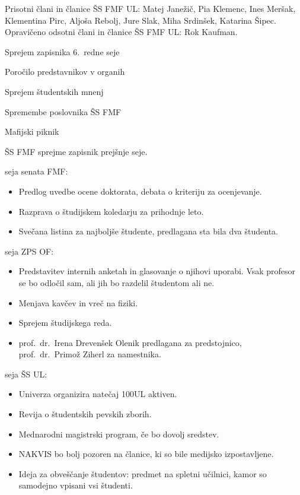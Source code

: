 \documentclass{seja}
\begin{document}
Prisotni člani in članice ŠS FMF UL:
Matej Janežič,
Pia Klemenc,
Ines Meršak,
Klementina Pirc,
Aljoša Rebolj,
Jure Slak,
Miha Srdinšek,
Katarina Šipec.
\\Opravičeno odsotni člani in članice ŠS FMF UL:
Rok Kaufman.

\begin{red*}
	\item
	Sprejem zapisnika 6.~redne seje
	\item
	Poročilo predstavnikov v organih
    \item
    Sprejem študentskih mnenj
    \item
    Spremembe poslovnika ŠS FMF
    \item
    Mafijski piknik
\end{red*}

\begin{ad}
    \item
    \begin{sklep*}
        ŠS FMF sprejme zapisnik prejšnje seje.
    \end{sklep*}

    \item
    seja senata FMF:
    \begin{itemize}
        \item Predlog uvedbe ocene doktorata, debata o kriteriju za ocenjevanje.
        \item Razprava o študijskem koledarju za prihodnje leto.
        \item Svečana listina za najboljše študente, predlagana sta bila dva študenta.
    \end{itemize}

    seja ZPS OF:
    \begin{itemize}
        \item Predstavitev internih anketah in glasovanje o njihovi uporabi. Vsak profesor se bo odločil sam, ali jih bo razdelil študentom ali ne.
        \item Menjava kavčev in vreč na fiziki.
        \item Sprejem študijskega reda.
        \item prof.~dr.~Irena Drevenšek Olenik predlagana za predstojnico, prof.~dr.~Primož Ziherl za namestnika.
    \end{itemize}

    seja ŠS UL:
    \begin{itemize}
        \item Univerza organizira natečaj 100UL aktiven.
        \item Revija o študentskih pevskih zborih.
        \item Mednarodni magistrski program, če bo dovolj sredstev.
        \item NAKVIS bo bolj pozoren na članice, ki so bile medijsko izpostavljene.
        \item Ideja za obveščanje študentov: predmet na spletni učilnici, kamor so samodejno vpisani vsi študenti.
    \end{itemize}


\end{ad}
\end{document}
